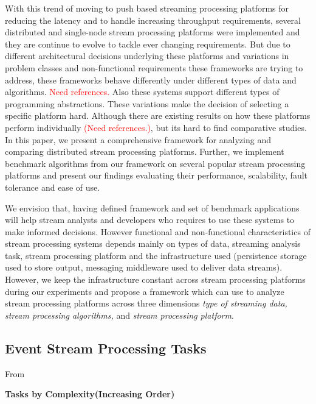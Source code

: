 \documentclass{sig-alternate}
\begin{document}
With this trend of moving to push based streaming processing platforms
for reducing the latency and to handle increasing throughput
requirements, several distributed and single-node stream processing
platforms were implemented and they are continue to evolve to tackle
ever changing requirements. But due to different architectural
decisions underlying these platforms and variations in problem classes and
non-functional requirements these frameworks are trying to address,
these frameworks behave differently under different types of data and
algorithms. \textcolor{Red}{Need references.} Also these systems
support different types of programming abstractions. These variations
make the decision of selecting a specific platform hard. Although
there are existing results on how these platforms perform
individually \textcolor{Red}{(Need references.)}, but its hard to find
comparative studies. In this paper, we present a comprehensive
framework for analyzing and comparing distributed stream processing
platforms. Further, we implement benchmark algorithms from our
 framework on several popular stream processing platforms and present
 our findings evaluating their performance, scalability, fault tolerance
 and ease of use.

 We envision that, having defined framework and set of benchmark applications
 will help stream analysts and developers who requires to use these systems to
 make informed decisions. However functional and non-functional characteristics
 of stream processing systems depends mainly on types of data, streaming analysis
 task, stream processing platform and the infrastructure used (persistence storage
 used to store output, messaging middleware used to deliver data streams). However,
 we keep the infrastructure constant across stream processing platforms during our
 experiments and propose a framework which can use to analyze stream processing
 platforms across three dimensions \textit{type of streaming data, stream processing
   algorithms,} and \textit{stream processing platform}.








 \subsection{Event Stream Processing Tasks}


From~\cite{streamdrill:presentation}

 \textbf{Tasks by Complexity(Increasing Order)}
\end{document}
